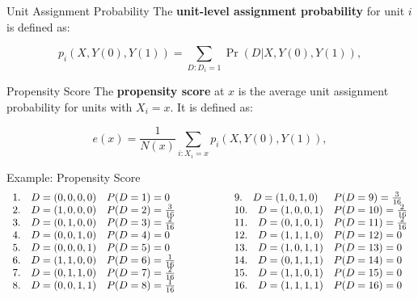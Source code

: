 \documentclass[xcolor=svgnames,t]{beamer}
\begin{document}
\begin{frame}{Unit Assignment Probability}
    The \textbf{unit-level assignment probability} for unit \( i \) is defined as:

    \[
    p_i(X, Y(0), Y(1)) = \sum_{D : D_i = 1} \Pr(D | X, Y(0), Y(1)),
    \]

  
\end{frame}



\begin{frame}{Propensity Score}
    The \textbf{propensity score} at \( x \) is the average unit assignment probability for units with \( X_i = x \). It is defined as:

    \[
    e(x) = \frac{1}{N(x)} \sum_{i : X_i = x} p_i(X, Y(0), Y(1)),
    \]


\end{frame}
\begin{frame}{Example: Propensity Score}
\scriptsize
   \[
    \begin{array}{ll@{\hspace{2cm}}ll}
    \text{1.} \quad D = (0, 0, 0, 0) & P(D = 1) = 0 & \text{9.} \quad D = (1, 0, 1, 0) & P(D = 9) = \frac{3}{16} \\

    \text{2.} \quad D = (1, 0, 0, 0) & P(D = 2) = \frac{3}{16} & \text{10.} \quad D = (1, 0, 0, 1) & P(D = 10) = \frac{2}{16} \\

    \text{3.} \quad D = (0, 1, 0, 0) & P(D = 3) = \frac{2}{16} & \text{11.} \quad D = (0, 1, 0, 1) & P(D = 11) = \frac{2}{16} \\

    \text{4.} \quad D = (0, 0, 1, 0) & P(D = 4) = 0 & \text{12.} \quad D = (1, 1, 1, 0) & P(D = 12) = 0 \\

    \text{5.} \quad D = (0, 0, 0, 1) & P(D = 5) = 0 & \text{13.} \quad D = (1, 0, 1, 1) & P(D = 13) = 0 \\

    \text{6.} \quad D = (1, 1, 0, 0) & P(D = 6) = \frac{1}{16} & \text{14.} \quad D = (0, 1, 1, 1) & P(D = 14) = 0 \\

    \text{7.} \quad D = (0, 1, 1, 0) & P(D = 7) = \frac{2}{16} & \text{15.} \quad D = (1, 1, 0, 1) & P(D = 15) = 0 \\

    \text{8.} \quad D = (0, 0, 1, 1) & P(D = 8) = \frac{1}{16} & \text{16.} \quad D = (1, 1, 1, 1) & P(D = 16) = 0 \\
    \end{array}
    \]
\end{frame}
\end{document}
